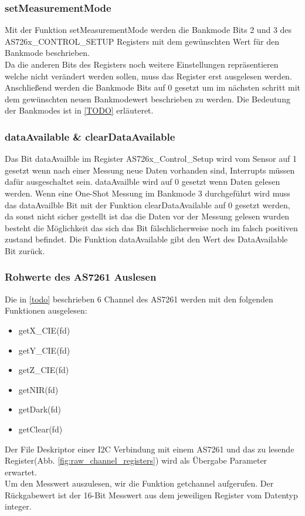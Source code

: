 \subsubsection{setMeasurementMode}
Mit der Funktion setMeasurementMode werden die Bankmode Bits 2 und 3 des \\
AS726x\_CONTROL\_SETUP Registers mit dem gewünschten Wert für den Bankmode beschrieben.\\
Da die anderen Bits des Registers noch weitere Einstellungen repräsentieren welche nicht verändert werden sollen, muss das Register erst ausgelesen werden.
Anschließend werden die Bankmode Bits auf 0 gesetzt um im nächsten schritt mit dem gewünschten neuen Bankmodewert beschrieben zu werden. 
Die Bedeutung der Bankmodes ist in \ref{TODO} erläuteret.

\subsubsection{dataAvailable \& clearDataAvailable}
Das Bit dataAvailble im Register AS726x\_Control\_Setup wird vom Sensor auf 1 gesetzt wenn nach einer Messung neue Daten vorhanden sind, Interrupts müssen dafür ausgeschaltet sein.
dataAvailble wird auf 0 gesetzt wenn Daten gelesen werden.
Wenn eine One-Shot Messung im Bankmode 3 durchgeführt wird muss das dataAvailble Bit mit der Funktion clearDataAvailable auf 0 gesetzt werden, da sonst nicht sicher gestellt ist das die Daten vor der Messung gelesen wurden besteht die Möglichkeit das sich das Bit fälschlicherweise noch im falsch positiven zustand befindet.
Die Funktion dataAvailable gibt den Wert des DataAvailable Bit zurück.\\

%

\subsubsection{Rohwerte des AS7261 Auslesen}
Die in \ref{todo} beschrieben 6 Channel des AS7261 werden mit den folgenden Funktionen ausgelesen:
\begin{itemize}
	\item getX\_CIE(fd)
	\item getY\_CIE(fd)
	\item getZ\_CIE(fd)
	\item getNIR(fd)
	\item getDark(fd) 
	\item getClear(fd)
\end{itemize}
Der File Deskriptor einer I2C Verbindung mit einem AS7261 und das zu lesende Register(Abb. \ref{fig:raw_channel_registers}) wird als Übergabe Parameter erwartet.\\
Um den Messwert auszulesen, wir die Funktion getchannel aufgerufen.
Der Rückgabewert ist der 16-Bit Messwert aus dem jeweiligen Register vom Datentyp integer.


